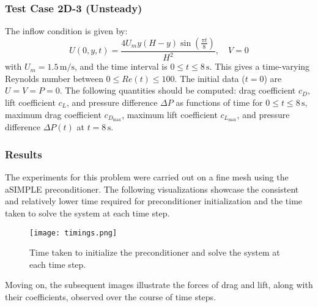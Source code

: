 \documentclass{article}
\begin{document}
    
\subsubsection{Test Case 2D-3 (Unsteady)}

The inflow condition is given by:
\[
U(0, y, t) = \frac{4U_m y (H - y) \sin\left(\frac{\pi t}{8}\right)}{H^2}, \quad V = 0
\]
with \(U_m = 1.5 \, \text{m/s}\), and the time interval is \(0 \leq t \leq 8 \, \text{s}\). This gives a time-varying Reynolds number between \(0 \leq Re(t) \leq 100\). The initial data (\(t = 0\)) are \(U = V = P = 0\). The following quantities should be computed: drag coefficient \(c_D\), lift coefficient \(c_L\), and pressure difference \(\Delta P\) as functions of time for \(0 \leq t \leq 8 \, \text{s}\), maximum drag coefficient \(c_{D_{\text{max}}}\), maximum lift coefficient \(c_{L_{\text{max}}}\), and pressure difference \(\Delta P(t)\) at \(t = 8 \, \text{s}\).


\subsubsection*{Results}
The experiments for this problem were carried out on a fine mesh using the aSIMPLE preconditioner. The following visualizations showcase the consistent and relatively lower time required for preconditioner initialization and the time taken to solve the system at each time step.

\begin{figure}[h]
    \centering
    \texttt{[image: timings.png]}
    \caption{Time taken to initialize the preconditioner and solve the system at each time step.}
\end{figure}

Moving on, the subsequent images illustrate the forces of drag and lift, along with their coefficients, observed over the course of time steps.
\end{document}

